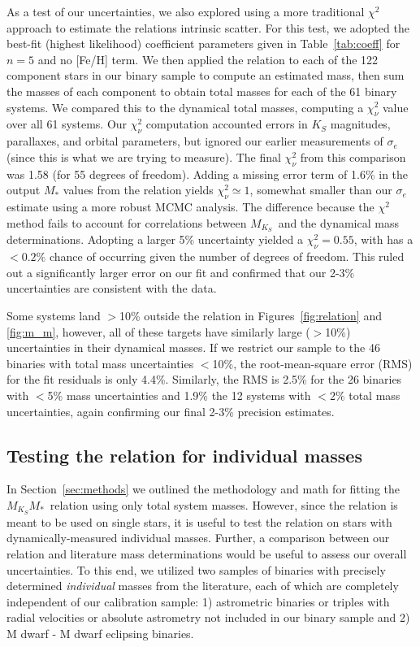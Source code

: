\documentclass[twocolumn]{aastex62}
\newcommand{\mks}{$M_{K_S}$}
\newcommand{\mmk}{$M_{K_S}$\textendash$M_*$}
\newcommand{\order}{5}
\begin{document}
As a test of our uncertainties, we also explored using a more traditional $\chi^2$ approach to estimate the relations intrinsic scatter. For this test, we adopted the best-fit (highest likelihood) coefficient parameters given in Table~\ref{tab:coeff} for $n=\order$ and no [Fe/H] term. We then applied the relation to each of the 122 component stars in our binary sample to compute an estimated mass, then sum the masses of each component to obtain total masses for each of the 61 binary systems. We compared this to the dynamical total masses, computing a $\chi^2_\nu$ value over all 61 systems. Our $\chi^2_\nu$ computation accounted errors in $K_S$ magnitudes, parallaxes, and orbital parameters, but ignored our earlier measurements of $\sigma_e$ (since this is what we are trying to measure). The final $\chi^2_\nu$ from this comparison was 1.58 (for 55 degrees of freedom). Adding a missing error term of 1.6\% in the output $M_*$ values from the relation yields $\chi^2_\nu \simeq 1$, somewhat smaller than our $\sigma_e$ estimate using a more robust MCMC analysis. The difference because the $\chi^2$ method fails to account for correlations between \mks\ and the dynamical mass determinations. Adopting a larger 5\% uncertainty yielded a $\chi^2_\nu=0.55$, with has a $<0.2\%$ chance of occurring given the number of degrees of freedom. This ruled out a significantly larger error on our fit and confirmed that our 2-3\% uncertainties are consistent with the data. 

Some systems land $>$10\% outside the relation in Figures~\ref{fig:relation} and \ref{fig:m_m}, however, all of these targets have similarly large ($>$10\%) uncertainties in their dynamical masses. If we restrict our sample to the 46 binaries with total mass uncertainties $<$10\%, the root-mean-square error (RMS) for the fit residuals is only 4.4\%. Similarly, the RMS is 2.5\% for the 26 binaries with $<$5\% mass uncertainties and 1.9\% the 12 systems  with $<2\%$ total mass uncertainties, again confirming our final 2-3\% precision estimates. 

 \subsection{Testing the relation for individual masses}\label{sec:test}
 In Section~\ref{sec:methods} we outlined the methodology and math for fitting the \mmk\ relation using only total system masses. However, since the relation is meant to be used on single stars, it is useful to test the relation on stars with dynamically-measured individual masses. Further, a comparison between our relation and literature mass determinations would be useful to assess our overall uncertainties. To this end, we utilized two samples of binaries with precisely determined {\it individual} masses from the literature, each of which are completely independent of our calibration sample: 1) astrometric binaries or triples with radial velocities or absolute astrometry not included in our binary sample and 2) M dwarf - M dwarf eclipsing binaries.
  
\end{document}
